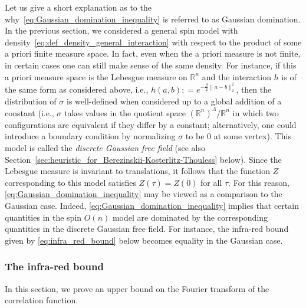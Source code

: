 \documentclass[12pt,reqno]{article}
\def\R{\mathbb{R}}
\begin{document}
\medbreak
{}
Let us give a short explanation as to the why~\eqref{eq:Gaussian_domination_inequality} is referred to as Gaussian domination. In the previous section, we considered a general spin model with density~\eqref{eq:def_density_general_interaction} with respect to the product of some a priori finite measure space. In fact, even when the a priori measure is not finite, in certain cases one can still make sense of the same density. For instance, if this a priori measure space is the Lebesgue measure on $\R^n$ and the interaction $h$ is of the same form as considered above, i.e., $h(a,b) : = e^{-\frac{\beta}{2}\|a-b\|_2^2}$, then the distribution of $\sigma$ is well-defined when considered up to a global addition of a constant (i.e., $\sigma$ takes values in the quotient space $(\R^n)^\Lambda/\R^n$ in which two configurations are equivalent if they differ by a constant; alternatively, one could introduce a boundary condition by normalizing $\sigma$ to be $0$ at some vertex). This model is called the \emph{discrete Gaussian free field} (see also Section~\ref{sec:heuristic_for_Berezinskii-Kosterlitz-Thouless} below). Since the Lebesgue measure is invariant to translations, it follows that the  function $Z$ corresponding to this model satisfies $Z(\tau)=Z(0)$ for all $\tau$. For this reason, \eqref{eq:Gaussian_domination_inequality} may be viewed as a comparison to the Gaussian case. Indeed, \eqref{eq:Gaussian_domination_inequality} implies that certain quantities in the spin $O(n)$ model are dominated by the corresponding quantities in the discrete Gaussian free field. For instance, the infra-red bound given by \eqref{eq:infra_red_bound} below becomes equality in the Gaussian case.

\subsubsection{The infra-red bound}
In this section, we prove an upper bound on the Fourier transform of the correlation function.
\end{document}

